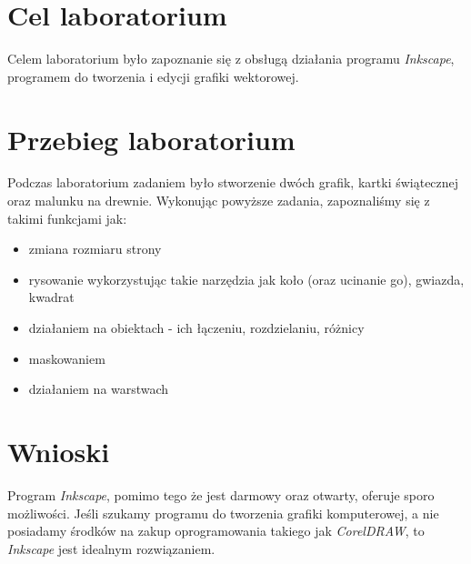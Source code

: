 \documentclass{article}
\begin{document}

\newpage
\section{Cel laboratorium}
Celem laboratorium było zapoznanie się z obsługą działania programu \emph{Inkscape}, programem do tworzenia i edycji grafiki wektorowej.
\section{Przebieg laboratorium}
Podczas laboratorium zadaniem było stworzenie dwóch grafik, kartki świątecznej oraz malunku na drewnie.
Wykonując powyższe zadania, zapoznaliśmy się z takimi funkcjami jak:

\begin{itemize}
\item zmiana rozmiaru strony
\item rysowanie wykorzystując takie narzędzia jak koło (oraz ucinanie go), gwiazda, kwadrat
\item działaniem na obiektach - ich łączeniu, rozdzielaniu, różnicy
\item maskowaniem
\item działaniem na warstwach
\end{itemize}
\section{Wnioski}
Program \emph{Inkscape}, pomimo tego że jest darmowy oraz otwarty, oferuje sporo możliwości. Jeśli szukamy programu do tworzenia grafiki komputerowej, a nie posiadamy środków na zakup oprogramowania takiego jak \emph{CorelDRAW}, to \emph{Inkscape} jest idealnym rozwiązaniem.
\end{document}
